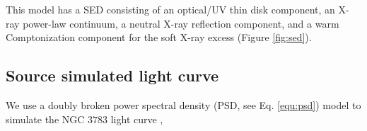 \documentclass{aa}
\begin{document}
This model 
has a SED consisting of an optical/UV thin disk component, an X-ray power-law continuum, a neutral X-ray reflection component, and a warm Comptonization component for the soft X-ray excess (Figure \ref{fig:sed}). 






\subsection{Source simulated light curve}\label{subsect:lc}
%
We use a doubly broken power spectral density (PSD, see Eq. \ref{equ:psd}) model to simulate the NGC $3783$ light curve \citep{Markowitz2005ApJ},
\end{document}
